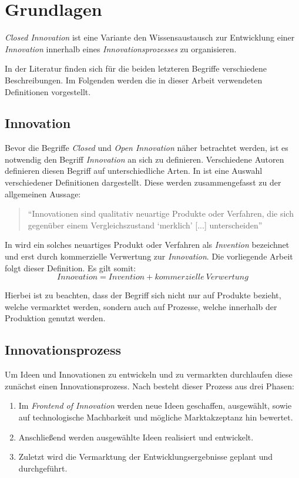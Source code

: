\section{Grundlagen}\label{sec:grundlagen}
\textit{Closed Innovation} ist eine Variante den Wissensaustausch
zur Entwicklung einer \textit{Innovation}
innerhalb eines \textit{Innovationsprozesses} zu organisieren.

In der Literatur finden sich für die beiden letzteren Begriffe verschiedene Beschreibungen.
Im Folgenden werden die in dieser Arbeit verwendeten Definitionen vorgestellt.

\subsection{Innovation}\label{sec:grundlagen-inno}
Bevor die Begriffe \textit{Closed} und \textit{Open Innovation} näher betrachtet werden,
ist es notwendig den Begriff \textit{Innovation} an sich zu definieren.
Verschiedene Autoren definieren diesen Begriff auf unterschiedliche Arten.
In \cite[5]{hauschildt2016innovationsmanagement} ist eine Auswahl verschiedener Definitionen dargestellt.
Diese werden zusammengefasst zu der allgemeinen Aussage:
\begin{quote}
    \enquote{Innovationen sind qualitativ neuartige Produkte oder Verfahren,
    die sich gegenüber einem Vergleichszustand \enquote{merklich} [...] unterscheiden}
    \cite[4]{hauschildt2016innovationsmanagement}
\end{quote}

In \cite[9]{herzog2011} wird ein solches neuartiges Produkt oder Verfahren als \textit{Invention} bezeichnet und erst durch kommerzielle Verwertung zur \textit{Innovation}.
Die vorliegende Arbeit folgt dieser Definition.
Es gilt somit:
\begin{equation*}
    Innovation = Invention + kommerzielle~Verwertung
\end{equation*}

Hierbei ist zu beachten, dass der Begriff sich nicht nur auf Produkte bezieht, welche vermarktet werden,
sondern auch auf Prozesse, welche innerhalb der Produktion genutzt werden.

\subsection{Innovationsprozess}\label{sec:grundlagen-prozess}
Um Ideen und Innovationen zu entwickeln und zu vermarkten durchlaufen diese zunächst einen Innovationsprozess.
Nach \cite[10\psq]{herzog2011} besteht dieser Prozess aus drei Phasen:
\begin{enumerate}
    \item Im \textit{Frontend of Innovation} werden neue Ideen geschaffen, ausgewählt, sowie auf technologische Machbarkeit und mögliche Marktakzeptanz hin bewertet.
    \item Anschließend werden ausgewählte Ideen realisiert und entwickelt.
    \item Zuletzt wird die Vermarktung der Entwicklungsergebnisse geplant und durchgeführt.
\end{enumerate}
